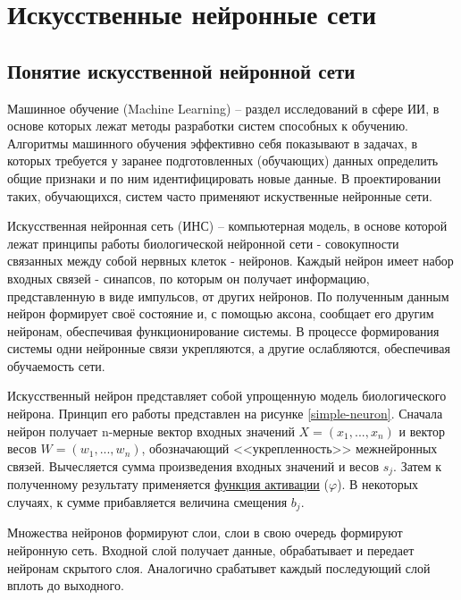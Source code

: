
\section{Искусственные нейронные сети}

\subsection{Понятие искусственной нейронной сети}

Машинное обучение (Machine Learning) – раздел исследований в сфере ИИ, в основе которых лежат методы разработки систем способных к обучению. Алгоритмы машинного обучения эффективно себя показывают в задачах, в которых требуется у заранее подготовленных (обучающих) данных определить общие признаки и по ним идентифицировать новые данные. В проектировании таких, обучающихся, систем часто применяют искуственные нейронные сети. 

Искусственная нейронная сеть (ИНС) – компьютерная модель, в основе которой лежат принципы работы биологической нейронной сети - совокупности связанных между собой нервных клеток - нейронов. Каждый нейрон имеет набор входных связей - синапсов, по которым он получает информацию, представленную в виде импульсов, от других нейронов. По полученным данным нейрон формирует своё состояние и, с помощью аксона, сообщает его другим нейронам, обеспечивая функционирование системы. В процессе формирования системы одни нейронные связи укрепляются, а другие ослабляются, обеспечивая обучаемость сети.

Искусственный нейрон представляет собой упрощенную модель биологического нейрона. Принцип его работы представлен на рисунке \ref{simple-neuron}. Сначала нейрон получает n-мерные вектор входных значений $X=(x_{1},...,x_{n})$ и вектор весов $W=(w_{1},...,w_{n})$, обозначающий <<укрепленность>> межнейронных связей. Вычесляется сумма произведения входных значений и весов $s_j$. Затем к полученному результату применяется \hyperref[sec:activation]{функция активации} ($\varphi$). В некоторых случаях, к сумме прибавляется величина смещения $b_j$.


Множества нейронов формируют слои, слои в свою очередь формируют нейронную сеть. Входной слой получает данные, обрабатывает и передает нейронам скрытого слоя. Аналогично срабатывет каждый последующий слой вплоть до выходного. 


